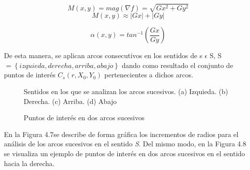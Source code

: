 \[
M(x,y) = mag(\nabla f) = \sqrt{Gx^{2} + Gy^{2}}
\]
\[
M(x,y) \approx \left | Gx \right | + \left | Gy \right |
\]

\[
\alpha(x,y) = tan^{-1} \left ( \frac{Gx}{Gy} \right )
\]

\begin{table}[htbp]
\begin{center}
\end{center}
\end{table}

De esta manera, se aplican arcos consecutivos en los sentidos  de s $\epsilon$ S, S $ = \left \{ \left. izquieda, derecha, arriba, abajo \right \} \right.$ dando como resultado el conjunto de puntos de interés $C_{s}(r, X_{0}, Y_{0})$ pertenecientes a dichos arcos. \\

\begin{figure}[htbp]
\centering
{}
\caption{Sentidos en los que se analizan los arcos sucesivos. (a) Izquieda. (b) Derecha. (c) Arriba. (d) Abajo} \label{fig:señales}
\end{figure}

\begin{figure}[htbp]
\centering
{}
\caption{Puntos de interés en dos arcos sucesivos} \label{fig:señales}
\end{figure}

En la Figura 4.7se describe de forma gráfica los incrementos de radios para el análisis de los arcos sucesivos en el sentido \textit{S}. Del mismo modo, en la Figura 4.8 se visualiza un ejemplo de puntos de interés en dos arcos sucesivos en el sentido hacia la derecha. \\


